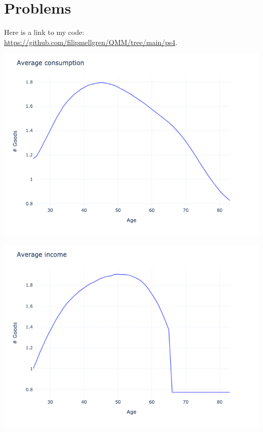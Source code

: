 \section{Problems}

Here is a link to my code: \url{https://github.com/filipmellgren/QMM/tree/main/ps4}.

\begin{questions}
\begin{solution}
\includegraphics[scale=0.5]{figures/mean_cons.png}

\includegraphics[scale=0.5]{figures/mean_income.png}


\end{solution}
\end{questions}
